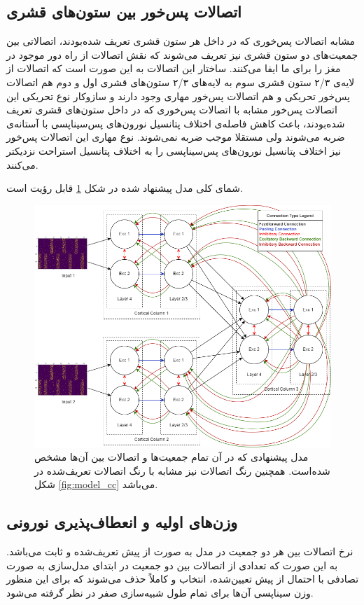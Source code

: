 \documentclass[12pt]{report}
\begin{document}
	\subsection{اتصالات پس‌خور بین ستون‌های قشری}
	
	مشابه اتصالات پس‌خوری که در داخل هر ستون قشری تعریف شده‌بودند، اتصالاتی بین جمعیت‌های دو ستون قشری نیز تعریف می‌شوند که نقش اتصالات از راه دور موجود در مغز را برای ما ایفا می‌کنند. ساختار این اتصالات به این صورت است که اتصالات از لایه‌ی ۲/۳ ستون قشری سوم به لایه‌های ۲/۳ ستون‌های قشری اول و دوم هم اتصالات پس‌خور تحریکی و هم اتصالات پس‌خور مهاری وجود دارند و سازوکار نوع تحریکی این اتصالات پس‌خور مشابه با اتصالات پس‌خوری که در داخل ستون‌های قشری تعریف شده‌بودند، باعث کاهش فاصله‌ی اختلاف پتانسیل نورون‌های پس‌سیناپسی با آستانه‌ی ضربه می‌شوند ولی مستقلا موجب ضربه نمی‌شوند. نوع مهاری این اتصالات پس‌خور نیز اختلاف پتانسیل نورون‌های پس‌سیناپسی را به اختلاف پتانسیل استراحت نزدیکتر می‌کنند. 
	
	شمای کلی مدل پیشنهاد شده در شکل \ref{fig:model_overall} قابل رؤیت است.
	
	\begin{figure}[]
		\centering
		\includegraphics[width=1.0\linewidth]{model_overall.png}
		\caption[NS]{
			مدل پیشنهادی که در آن تمام جمعیت‌ها و اتصالات بین آن‌ها مشخص شده‌است. همچنین رنگ اتصالات نیز مشابه با رنگ اتصالات تعریف‌شده در شکل \ref{fig:model_cc} می‌باشد.
		}
		\label{fig:model_overall} 
	\end{figure}

	\subsection{وزن‌های اولیه و انعطاف‌پذیری نورونی}
	نرخ اتصالات بین هر دو جمعیت در مدل به صورت از پیش تعریف‌شده و ثابت می‌باشد. به این صورت که تعدادی از اتصالات بین دو جمعیت در ابتدای مدل‌سازی به صورت تصادفی با احتمال از پیش تعیین‌شده، انتخاب و کاملاً حذف می‌شوند که برای این منظور وزن سیناپسی‌ آن‌ها برای تمام طول شبیه‌سازی صفر در نظر گرفته می‌شود.
	
\end{document}
